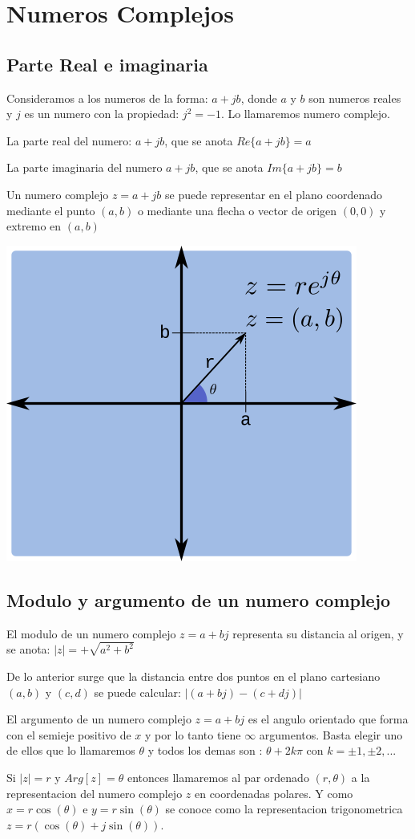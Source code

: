 \section{Numeros Complejos}
   \subsection{Parte Real e imaginaria}
\begin{defi}
Consideramos a los numeros de la forma: $a+jb$, donde $a$ y $b$ son numeros reales y $j$ es un numero con la propiedad: $j^{2}=-1$. Lo llamaremos numero complejo.
\end{defi}

\begin{ejemplo}
La parte real del numero: $a+jb$, que se anota $Re\{a+jb\}=a$

La parte imaginaria del numero $a+jb$, que se anota $Im\{a+jb\}=b$
\end{ejemplo}
\begin{defi}
   Un numero complejo $z=a+jb$ se puede representar en el plano coordenado mediante el punto $(a, b)$ o mediante una flecha o vector de origen $(0, 0)$ y extremo en $(a, b)$
\end{defi}

\includegraphics[width=.23\textwidth]{../Algebra/Images/complex_numbers.png}
\subsection{Modulo y argumento de un numero complejo}
\begin{defi}
   El modulo de un numero complejo $z=a+bj$ representa su distancia al origen, y se anota: $|z| = +\sqrt{a^{2}+b^{2}}$
\end{defi}
De lo anterior surge que la distancia entre dos puntos en el plano cartesiano $(a,b)$ y $(c,d)$ se puede calcular: $|(a+bj)-(c+dj)|$
\begin{defi}
   El argumento de un numero complejo $z=a+bj$ es el angulo orientado que forma con el semieje positivo de $x$ y por lo tanto tiene $\infty$ argumentos. Basta elegir uno de ellos que lo llamaremos $\theta$ y todos los demas son : $\theta+2k\pi$ con $k=\pm 1, \pm 2, ...$
\end{defi}
Si $|z|=r$ y $Arg[z]=\theta$ entonces llamaremos al par ordenado $(r, \theta)$ a la representacion del numero complejo $z$ en coordenadas polares. Y como $x=r\cos(\theta)$ e $y=r\sin(\theta)$ se conoce como la representacion trigonometrica $z=r(\cos(\theta)+ j\sin(\theta))$.

